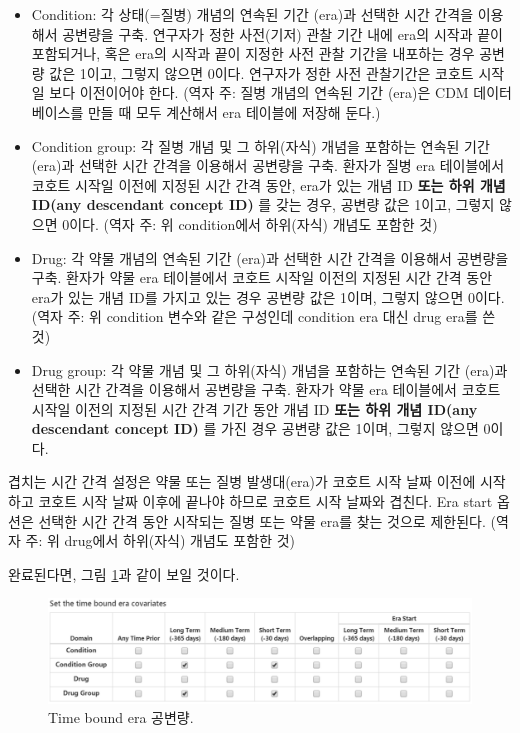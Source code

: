 \documentclass[10.5pt]{book}
\providecommand{\tightlist}{%
  \setlength{\itemsep}{0pt}\setlength{\parskip}{0pt}}
\theoremstyle{definition}
\theoremstyle{definition}
\theoremstyle{definition}
\theoremstyle{remark}
\begin{document}
\begin{itemize}
\tightlist
\item
  Condition: 각 상태(=질병) 개념의 연속된 기간 (era)과 선택한 시간
  간격을 이용해서 공변량을 구축. 연구자가 정한 사전(기저) 관찰 기간 내에
  era의 시작과 끝이 포함되거나, 혹은 era의 시작과 끝이 지정한 사전 관찰
  기간을 내포하는 경우 공변량 값은 1이고, 그렇지 않으면 0이다. 연구자가
  정한 사전 관찰기간은 코호트 시작일 보다 이전이어야 한다. (역자 주:
  질병 개념의 연속된 기간 (era)은 CDM 데이터베이스를 만들 때 모두
  계산해서 era 테이블에 저장해 둔다.)
\item
  Condition group: 각 질병 개념 및 그 하위(자식) 개념을 포함하는 연속된
  기간 (era)과 선택한 시간 간격을 이용해서 공변량을 구축. 환자가 질병
  era 테이블에서 코호트 시작일 이전에 지정된 시간 간격 동안, era가 있는
  개념 ID \textbf{또는 하위 개념 ID(any descendant concept ID)} 를 갖는
  경우, 공변량 값은 1이고, 그렇지 않으면 0이다. (역자 주: 위
  condition에서 하위(자식) 개념도 포함한 것)
\item
  Drug: 각 약물 개념의 연속된 기간 (era)과 선택한 시간 간격을 이용해서
  공변량을 구축. 환자가 약물 era 테이블에서 코호트 시작일 이전의 지정된
  시간 간격 동안 era가 있는 개념 ID를 가지고 있는 경우 공변량 값은
  1이며, 그렇지 않으면 0이다. (역자 주: 위 condition 변수와 같은
  구성인데 condition era 대신 drug era를 쓴 것)
\item
  Drug group: 각 약물 개념 및 그 하위(자식) 개념을 포함하는 연속된 기간
  (era)과 선택한 시간 간격을 이용해서 공변량을 구축. 환자가 약물 era
  테이블에서 코호트 시작일 이전의 지정된 시간 간격 기간 동안 개념 ID
  \textbf{또는 하위 개념 ID(any descendant concept ID)} 를 가진 경우
  공변량 값은 1이며, 그렇지 않으면 0이다.
\end{itemize}

겹치는 시간 간격 설정은 약물 또는 질병 발생대(era)가 코호트 시작 날짜
이전에 시작하고 코호트 시작 날짜 이후에 끝나야 하므로 코호트 시작 날짜와
겹친다. Era start 옵션은 선택한 시간 간격 동안 시작되는 질병 또는 약물
era를 찾는 것으로 제한된다. (역자 주: 위 drug에서 하위(자식) 개념도
포함한 것)

완료된다면, 그림 \ref{fig:covariateSettings4}과 같이 보일 것이다.

\begin{figure}

{\centering \includegraphics[width=1\linewidth]{images/PatientLevelPrediction/covariateSettings4} 

}

\caption{Time bound era 공변량.}\label{fig:covariateSettings4}
\end{figure}
\end{document}
